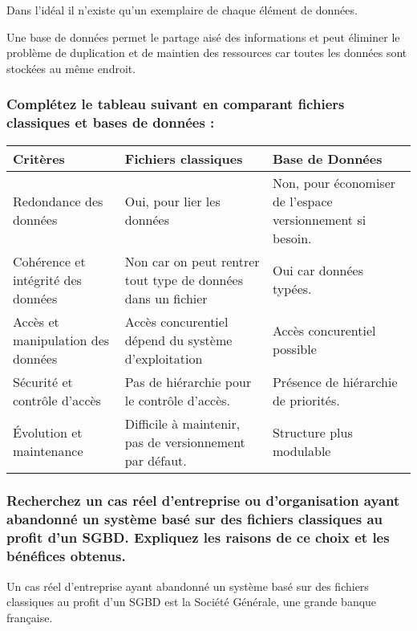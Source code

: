 \documentclass{article}
\begin{document}
Dans l’idéal il n’existe qu’un exemplaire de chaque élément de données.

Une base de données permet le partage aisé des informations et peut éliminer le
problème de duplication et de maintien des ressources car toutes les données sont
stockées au même endroit.

\subsubsection{Complétez le tableau suivant en comparant fichiers classiques et bases de données :}

\begin{table}[H]
    \centering
    \begin{tabular}{|p{5cm}|p{5cm}|p{5cm}|}
        \hline
        \rowcolor[gray]{0.75} \textbf{Critères} & \textbf{Fichiers classiques} & \textbf{Base de Données} \\
        \hline
        Redondance des données & Oui, pour lier les données & Non, pour économiser de l'espace versionnement si besoin.\\
        \hline
        Cohérence et intégrité des données & Non car on peut rentrer tout type de données dans un fichier & Oui car données typées.\\
        \hline
        Accès et manipulation des données & Accès concurentiel dépend du système d'exploitation & Accès concurentiel possible\\
        \hline
        Sécurité et contrôle d’accès & Pas de hiérarchie pour le contrôle d'accès. & Présence de hiérarchie de priorités.\\
        \hline
        Évolution et maintenance & Difficile à maintenir, pas de versionnement par défaut. & Structure plus modulable\\
        \hline
    \end{tabular}
\end{table}


    \subsubsection{Recherchez un cas réel d’entreprise ou d’organisation ayant abandonné un système basé sur des fichiers classiques au profit d’un SGBD. Expliquez les raisons de ce choix et les bénéfices obtenus.} \par 

Un cas réel d’entreprise ayant abandonné un système basé sur des fichiers classiques au profit d’un SGBD est la Société Générale, une grande banque française.
\end{document}
